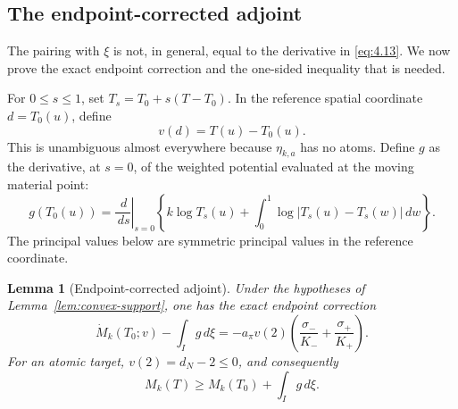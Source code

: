 \documentclass[11pt]{article}
\numberwithin{equation}{section}
\theoremstyle{plain}
\newtheorem{lemma}[theorem]{Lemma}
\theoremstyle{definition}
\theoremstyle{remark}
\newcommand{\1}{\mathbf 1}
\newcommand{\dd}{\,d}
\begin{document}
\subsection{The endpoint-corrected adjoint}

The pairing with $\xi$ is not, in general, equal to the derivative in
\eqref{eq:4.13}.  We now prove the exact endpoint correction and the one-sided
inequality that is needed.

For $0\le s\le1$, set $T_s=T_0+s(T-T_0)$.  In the reference spatial
coordinate $d=T_0(u)$, define
\[
 v(d)=T(u)-T_0(u).
\]
This is unambiguous almost everywhere because $\eta_{k,a}$ has no atoms.
Define $g$ as the derivative, at $s=0$, of the weighted potential evaluated
at the moving material point:
\[
 g(T_0(u))=
 \left.\frac{\dd}{\dd s}\right|_{s=0}
 \left\{k\log T_s(u)+
 \int_0^1\log|T_s(u)-T_s(w)|\dd w\right\}.
\]
The principal values below are symmetric principal values in the reference
coordinate.

\begin{lemma}[Endpoint-corrected adjoint]\label{lem:adjoint}
Under the hypotheses of Lemma~\ref{lem:convex-support}, one has the exact
endpoint correction
\[
 \dot M_k(T_0;v)-\int_Ig\dd\xi
 =-a_\pi v(2)\left(\frac{\sigma_-}{K_-}
                    +\frac{\sigma_+}{K_+}\right).
\]
For an atomic target, $v(2)=d_N-2\le0$, and consequently
\[
 M_k(T)\ge M_k(T_0)+\int_Ig\dd\xi.
\]
\end{lemma}
\end{document}
